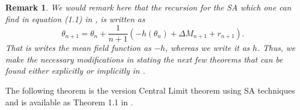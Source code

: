 \documentclass{article}
\numberwithin{equation}{section}
\newtheorem{remark}{Remark}
\newcommand{\1}{\mathbf{1}}
\newcommand{\0}{\mathbf{0}}
\begin{document}

\begin{remark} We would remark here that the recursion for the SA which one can find in equation (1.1) in \cite{Zh_2016}, is written as 
\[
\theta_{n+1}=\theta_{n}+\frac{1}{n+1}\left(-h(\theta_n)+ \Delta M_{n+1}+ r_{n+1}\right).
\]
That is \cite{Zh_2016} writes the mean field function as $-h$, whereas we write it as $h$. Thus, we make the necessary modifications in stating the next few theorems that can be found either explicitly or implicitly in \cite{Zh_2016}. 
\end{remark}
The following theorem is the version Central Limit theorem using SA techniques and is available as Theorem 1.1 in \cite{Zh_2016}.
\end{document}
